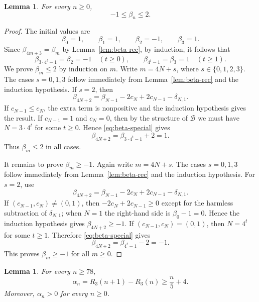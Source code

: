 \documentclass[11pt]{amsart}
\newtheorem{lemma}[theorem]{Lemma}
\theoremstyle{remark}
\theoremstyle{plain}
\newcommand{\BaseB}{\mathcal B}
\begin{document}
\begin{lemma}\label{lem:beta-bound}
For every $n\ge 0$,
\[
-1\le \beta_n\le 2.
\]
\end{lemma}

\begin{proof}
The initial values are
\[
\beta_0=1,\qquad \beta_1=1,\qquad \beta_2=-1,\qquad \beta_3=1.
\]
Since $\beta_{4m+3}=\beta_m$ by Lemma~\ref{lem:beta-rec}, by induction, it follows that
\begin{equation}\label{eq:beta-special}
\beta_{3\cdot 4^t-1}=\beta_2=-1\quad (t\ge 0),\qquad \beta_{4^t-1}=\beta_3=1\quad (t\ge 1).
\end{equation}
We prove $\beta_m\le 2$ by induction on $m$. Write $m=4N+s$, where $s\in\{0,1,2,3\}$. The cases $s=0,1,3$ follow immediately from Lemma~\ref{lem:beta-rec} and the induction hypothesis. If $s=2$, then
\[
\beta_{4N+2}=\beta_{N-1}-2c_N+2c_{N-1}-\delta_{N,1}.
\]
If $c_{N-1}\le c_N$, the extra term is nonpositive and the induction hypothesis gives the result. If $c_{N-1}=1$ and $c_N=0$, then by the structure of $\BaseB$ we must have $N=3\cdot 4^t$ for some $t\ge 0$. Hence \eqref{eq:beta-special} gives
\[
\beta_{4N+2}=\beta_{3\cdot 4^t-1}+2=1.
\]
Thus $\beta_m\le 2$ in all cases.

It remains to prove $\beta_m\ge -1$. Again write $m=4N+s$. The cases $s=0,1,3$ follow immediately from Lemma~\ref{lem:beta-rec} and the induction hypothesis. For $s=2$, use
\[
\beta_{4N+2}=\beta_{N-1}-2c_N+2c_{N-1}-\delta_{N,1}.
\]
If $(c_{N-1},c_N)\ne (0,1)$, then $-2c_N+2c_{N-1}\ge 0$ except for the harmless subtraction of $\delta_{N,1}$; when $N=1$ the right-hand side is $\beta_0-1=0$. Hence the induction hypothesis gives $\beta_{4N+2}\ge -1$. If $(c_{N-1},c_N)=(0,1)$, then $N=4^t$ for some $t\ge 1$. Therefore \eqref{eq:beta-special} gives
\[
\beta_{4N+2}=\beta_{4^t-1}-2=-1.
\]
This proves $\beta_m\ge -1$ for all $m\ge 0$.
\end{proof}

\begin{lemma}\label{lem:alpha-lower}
For every $n\ge 78$,
\[
\alpha_n=R_3(n+1)-R_3(n)\ge \frac n5+4.
\]
Moreover, $\alpha_n>0$ for every $n\ge 0$.
\end{lemma}
\end{document}
